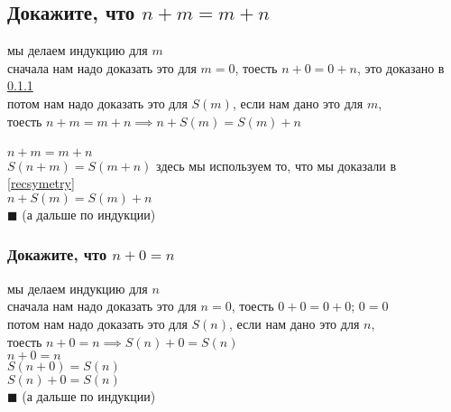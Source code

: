 \documentclass{article}
\begin{document}
  \subsection{Докажите, что $n+m = m+n$}
  мы делаем индукцию для $m$ \\
  сначала нам надо доказать это для $m=0$, тоесть $ n+0 = 0+n $, это доказано в \ref{zerosymetry} \\
  потом нам надо доказать это для $S(m)$, если нам дано это для $m$, \\
  тоесть $ n+m = m+n \implies n+S(m) = S(m)+n $ \\ \\
  $ n+m = m+n $ \\
  $ S(n+m) = S(m+n) $ \qquad здесь мы используем то, что мы доказали в \ref{recsymetry} \\
  $ n+S(m) = S(m)+n $ \\
  $\blacksquare$ (а дальше по индукции)
  \subsubsection{Докажите, что $n+0 = n$}
  \label{zerosymetry}
  мы делаем индукцию для $n$ \\
  сначала нам надо доказать это для $n=0$, тоесть $ 0+0 = 0+0 $; $ 0 = 0 $ \\
  потом нам надо доказать это для $S(n)$, если нам дано это для $n$, \\
  тоесть $ n+0 = n \implies S(n)+0 = S(n) $ \\
  $ n+0 = n $ \\
  $ S(n+0) = S(n) $ \\
  $ S(n)+0 = S(n) $ \\
  $\blacksquare$ (а дальше по индукции)
\end{document}
